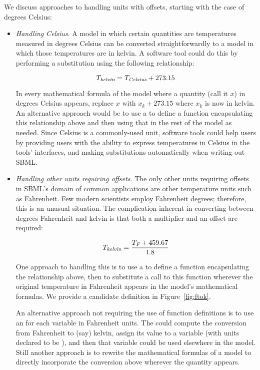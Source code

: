 We discuss approaches to handling units with offsets, starting
with the case of degrees Celsius:
\begin{itemize}

\item \emph{Handling Celsius}.  A model in which certain
  quantities are temperatures measured in degrees Celsius can be
  converted straightforwardly to a model in which those
  temperatures are in kelvin.  A software tool could do this by
  performing a substitution using the following relationship:
  \begin{linenomath}
    \begin{equation*}
      T_\emph{kelvin} = T_\emph{Celsius} + 273.15
    \end{equation*}
  \end{linenomath}
  In every mathematical formula of the model where a quantity
  (call it $x$) in degrees Celsius appears, replace $x$ with $x_k
  + 273.15$ where $x_k$ is now in kelvin.  An alternative approach
  would be to use a \FunctionDefinition to define a function
  encapsulating this relationship above and then using that in the
  rest of the model as needed.  Since Celsius is a commonly-used
  unit, software tools could help users by providing users with
  the ability to express temperatures in Celsius in the tools'
  interfaces, and making substitutions automatically when writing
  out SBML.

\item \emph{Handling other units requiring offsets}.  The only
  other units requiring offsets in SBML's domain of common
  applications are other temperature units such as Fahrenheit.
  Few modern scientists employ Fahrenheit degrees; therefore, this
  is an unusual situation.  The complication inherent in
  converting between degrees Fahrenheit and kelvin is that both a
  multiplier and an offset are required:
  \begin{linenomath}
    \begin{equation*}
      T_\emph{kelvin} = \frac{T_\emph{F} + 459.67}{1.8}
      \label{eq:fah-kelvin}
    \end{equation*}
  \end{linenomath}

  One approach to handling this is to use a \FunctionDefinition to
  define a function encapsulating the relationship above, then to
  substitute a call to this function wherever the original
  temperature in Fahrenheit appears in the model's mathematical
  formulas.  We provide a candidate definition in
  Figure~\vref{fig:ftok}. 

  An alternative approach not requiring the use of function
  definitions is to use an \AssignmentRule for each variable in
  Fahrenheit units.  The \AssignmentRule could compute the
  conversion from Fahrenheit to (say) kelvin, assign its value to
  a variable (with units declared to be ), and then
  that variable could be used elsewhere in the model.  Still
  another approach is to rewrite the mathematical formulas of a
  model to directly incorporate the conversion above wherever the
  quantity appears.

\end{itemize}

